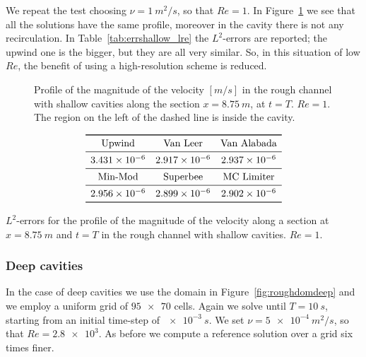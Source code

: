We repeat the test choosing $\nu=\SI{1}{m^2/s}$, so that $Re=1$. In 
Figure~\ref{fig:linecompshallowlre} we see that all the solutions have the same 
profile, moreover in the cavity there is not any recirculation. In 
Table~\ref{tab:errshallow_lre} the $L^2$-errors are reported; the upwind one is 
the bigger, but they are all very similar. So, in this situation of low $Re$, 
the benefit of using a high-resolution scheme is reduced.
\begin{figure}
	\centering
	
	\caption[Profile of the magnitude of the velocity in the rough channel with 
	shallow cavities at $Re=1$]{Profile of the magnitude of the velocity 
	$[\si{m/s}]$ in the rough channel with shallow cavities along the section 
	$x=\SI{8.75}{m}$, at $t=T$. $Re=1$. The region on the left of the 
	dashed line is inside the cavity.}
	\label{fig:linecompshallowlre}
\end{figure}
\begin{table}
	\centering
	\[
	\begin{array}{ccc}
	\toprule
	\text{Upwind} & \text{Van Leer} & \text{Van Alabada}\\
	\midrule
	\num{3.431e-6} & \num{2.917e-6} & \num{2.937e-6}\\
	\midrule
	\text{Min-Mod} & \text{Superbee} & \text{MC Limiter} \\ 
	\midrule
	\num{2.956e-6} & \num{2.899e-6} & \num{2.902e-6}\\
	\bottomrule
	\end{array}
	\]
	\caption[$L^2$-errors for the profile of the magnitude of the velocity in 
	the rough channel with shallow cavities at $Re=1$]{$L^2$-errors for the 
	profile of the magnitude of the velocity along a section at 
	$x=\SI{8.75}{m}$ and $t=T$ in the rough channel with shallow 
	cavities. $Re = 1$.}
	\label{tab:errshallow_lre}
\end{table}
%
\subsubsection{Deep cavities}
In the case of deep cavities we use the domain in Figure~\ref{fig:roughdomdeep} 
and we employ a uniform grid of $\num{95x70}$ cells. Again we solve until 
$T=\SI{10}{s}$, starting from an initial time-step of $\SI{e-3}{s}$. We set 
$\nu=\SI{5e-4}{m^2/s}$, so that $Re=\num{2.8e3}$. As before we compute a 
reference solution over a grid six times finer.

